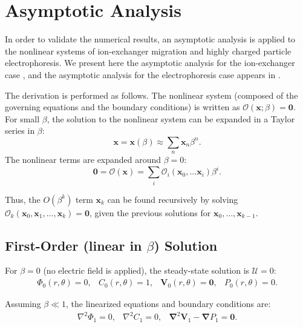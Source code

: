 \documentclass[10pt]{ijnam}
\newcommand\Laplacian{\nabla^2}
\newcommand\bnabla{\boldsymbol{\nabla}}
\newcommand\bLaplacian{\boldsymbol{\nabla}^2}
\newcommand\bV{\boldsymbol{V}}
\newcommand\bx{\boldsymbol{x}}
\newcommand\bzero{\boldsymbol{0}}
\newcommand\cO{\mathcal{O}}
\newcommand\cU{\mathscr{U}}
\begin{document}
\section{Asymptotic Analysis} \label{sec:asymp}
In order to validate the numerical results, an asymptotic analysis is applied 
to the nonlinear systems of ion-exchanger migration 
and highly charged particle electrophoresis.
We present here the asymptotic analysis for the ion-exchanger case \cite{yariv2010migration},
and the asymptotic analysis for the electrophoresis case \cite{schnitzer2012surface}
appears in \cite{schnitzer2012cubic}.

The derivation is performed as follows.
The nonlinear system (composed of the governing equations and the boundary conditions) 
is written as $\cO(\bx;\beta) = \bzero$.
For small $\beta$, the solution to the nonlinear system can be expanded in a Taylor series in $\beta$:
\begin{equation}
\bx = \bx(\beta) \approx \sum_n \bx_n \beta^n.
\end{equation}
The nonlinear terms
are expanded around $\beta = 0$:
\begin{equation}
\bzero = \cO(\bx) = \sum_i \cO_i(\bx_0, \ldots \bx_i) \beta^i.
\end{equation}

Thus, the $O(\beta^k)$ term $\bx_k$ can be found recursively by solving 
$\cO_k(\bx_0, \bx_1, \ldots, \bx_k) = \bzero$,
given the previous solutions for $\bx_0, \ldots, \bx_{k-1}$.


\subsection{First-Order (linear in $\beta$) Solution} \label{app:linear}

For $\beta = 0$ (no electric field is applied), the steady-state solution is $\cU = 0$:
\begin{equation}\begin{array}{cccc}
\varPhi_0(r,\theta) = 0, &
C_0(r,\theta) = 1, &
\bV_0(r,\theta) = \bzero, &
P_0(r,\theta) = 0.
\end{array}\end{equation}

Assuming $\beta \ll 1$, the linearized equations and boundary conditions are:
\begin{equation} \begin{array}{ccc}
\Laplacian \varPhi_1 = 0, &
\Laplacian C_1 = 0, &
\bLaplacian \bV_1 - \bnabla P_1 = \bzero.
\end{array}\end{equation}
\end{document}
